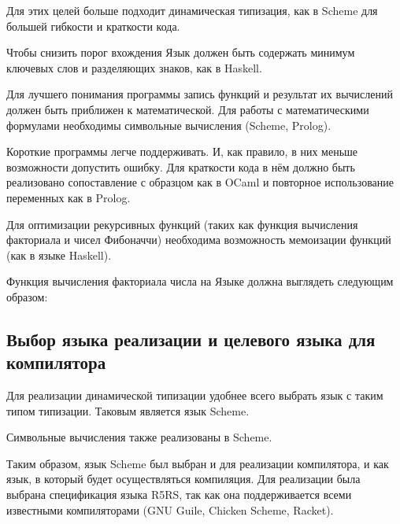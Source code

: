         Для этих целей больше подходит динамическая типизация, как в Scheme для большей гибкости и краткости кода.

        Чтобы снизить порог вхождения Язык должен быть содержать минимум ключевых слов и разделяющих знаков, как в Haskell.

        Для лучшего понимания программы запись функций и результат их вычислений должен быть приближен к математической.
        Для работы с математическими формулами необходимы символьные вычисления (Scheme, Prolog).

        Короткие программы легче поддерживать.
        И, как правило, в них меньше возможности допустить ошибку.
        Для краткости кода в нём должно быть реализовано сопоставление с образцом как в OCaml и повторное использование переменных как в Prolog.

        Для оптимизации рекурсивных функций (таких как функция вычисления факториала и чисел Фибоначчи) необходима возможность мемоизации функций (как в языке Haskell).

        Функция вычисления факториала числа на Языке должна выглядеть следующим образом:

        

    \subsection{Выбор языка реализации и целевого языка для компилятора}
        Для реализации динамической типизации удобнее всего выбрать язык с таким типом типизации.
        Таковым является язык Scheme.

        Символьные вычисления также реализованы в Scheme.

        Таким образом, язык Scheme был выбран и для реализации компилятора, и как язык, в который будет осуществляться компиляция.
        Для реализации была выбрана спецификация языка R5RS, так как она поддерживается всеми известными компиляторами (GNU Guile, Chicken Scheme, Racket).
